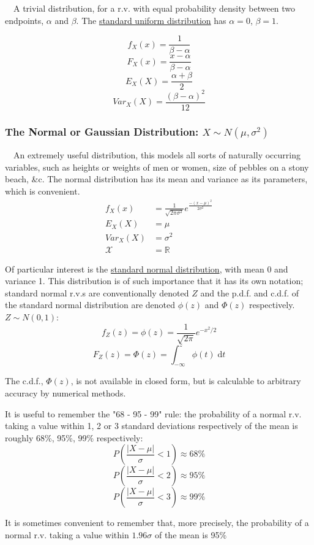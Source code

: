 \documentclass[12pt,a4paper]{article}
\begin{document}
$\quad$A trivial distribution, for a r.v. with equal probability density between two endpoints, $\alpha$ and $\beta$. The \underline{standard uniform distribution} has $\alpha = 0$, $\beta = 1$.

$$f_X(x) = \frac{1}{\beta-\alpha}$$
$$F_X(x) = \frac{x-\alpha}{\beta-\alpha}$$
$$E_{X}(X) = \frac{\alpha+\beta}{2}$$
$$Var_{X}(X) = \frac{(\beta-\alpha)^2}{12}$$

\subsubsection{The Normal or Gaussian Distribution: $X \sim N(\mu, \sigma^2)$}

$\quad$An extremely useful distribution, this models all sorts of naturally occurring variables, such as heights or weights of men or women, size of pebbles on a stony beach, \&c. The normal distribution has its mean and variance as its parameters, which is convenient.
\begin{align*}
f_X(x) &= \frac{1}{\sqrt{2\pi\sigma^2}}e^{\frac{-(x-\mu)^2}{2\sigma^2}}\\
E_{X}(X) &= \mu\\
Var_{X}(X) &= \sigma^2\\
\mathcal{X} &= \mathbb{R}
\end{align*}

Of particular interest is the \underline{standard normal distribution}, with mean 0 and variance 1. This distribution is of such importance that it has its own notation; standard normal r.v.s are conventionally denoted $Z$ and the p.d.f. and c.d.f. of the standard normal distribution are denoted $\phi(z)$ and $\Phi(z)$ respectively. $Z \sim N(0,1)$:
$$f_Z(z) = \phi(z) = \frac{1}{\sqrt{2\pi}}e^{-x^2/2}$$
$$F_Z(z) = \Phi(z) = \int_{-\infty}^{z} \!\phi(t)\; \mathrm{d}t$$

The c.d.f., $\Phi(z)$, is not available in closed form, but is calculable to arbitrary accuracy by numerical methods.

It is useful to remember the "68 - 95 - 99" rule: the probability of a normal r.v. taking a value within 1, 2 or 3 standard deviations respectively of the mean is roughly 68\%, 95\%, 99\% respectively:
$$P\left( \frac{|X-\mu|}{\sigma}< 1\right) \approx 68\%$$
$$P\left( \frac{|X-\mu|}{\sigma} < 2\right) \approx 95\%$$
$$P\left( \frac{|X-\mu|}{\sigma} < 3\right) \approx 99\%$$

It is sometimes convenient to remember that, more precisely, the probability of a normal r.v. taking a value within $1.96\sigma$ of the mean is 95\%
\end{document}
